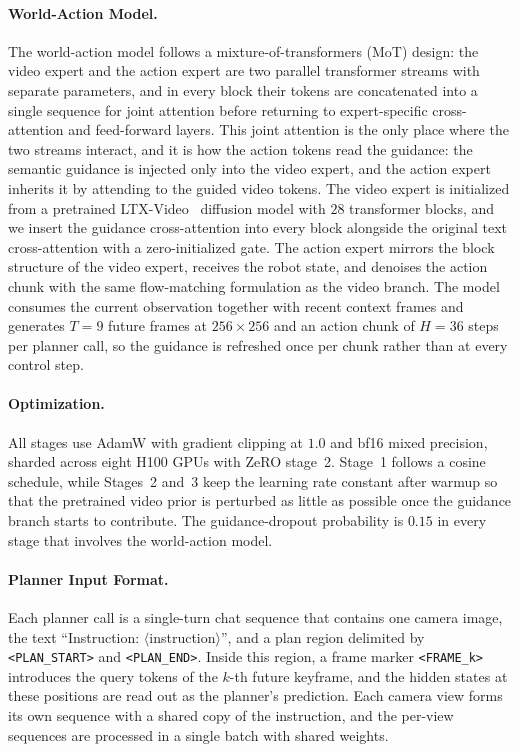 \paragraph{World-Action Model.}
The world-action model follows a mixture-of-transformers (MoT) design: the video
expert and the action expert are two parallel transformer streams with separate
parameters, and in every block their tokens are concatenated into a single
sequence for joint attention before returning to expert-specific cross-attention
and feed-forward layers.
This joint attention is the only place where the two streams interact, and it is
how the action tokens read the guidance: the semantic guidance is injected only
into the video expert, and the action expert inherits it by attending to the
guided video tokens.
The video expert is initialized from a pretrained LTX-Video~\cite{ltxvideo} diffusion model with
$28$ transformer blocks, and we insert the guidance cross-attention into every
block alongside the original text cross-attention with a zero-initialized gate.
The action expert mirrors the block structure of the video expert, receives the
robot state, and denoises the action chunk with the same flow-matching
formulation as the video branch.
The model consumes the current observation together with recent context frames
and generates $T{=}9$ future frames at $256{\times}256$ and an action chunk of
$H{=}36$ steps per planner call, so the guidance is refreshed once per chunk
rather than at every control step.

\paragraph{Optimization.}
All stages use AdamW with gradient clipping at $1.0$ and bf16 mixed precision,
sharded across eight H100 GPUs with ZeRO stage~2.
Stage~1 follows a cosine schedule, while Stages~2 and~3 keep the learning rate
constant after warmup so that the pretrained video prior is perturbed as little
as possible once the guidance branch starts to contribute.
The guidance-dropout probability is $0.15$ in every stage that involves the
world-action model.

\paragraph{Planner Input Format.}
Each planner call is a single-turn chat sequence that contains one camera image,
the text ``Instruction: $\langle$instruction$\rangle$'', and a plan region
delimited by \texttt{<PLAN\_START>} and \texttt{<PLAN\_END>}.
Inside this region, a frame marker \texttt{<FRAME\_k>} introduces the query
tokens of the $k$-th future keyframe, and the hidden states at these positions
are read out as the planner's prediction.
Each camera view forms its own sequence with a shared copy of the instruction,
and the per-view sequences are processed in a single batch with shared weights.

